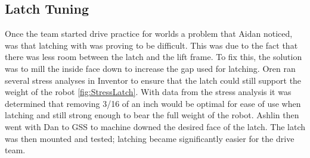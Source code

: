 \documentclass{article}
\begin{document}
\subsection{Latch Tuning}
Once the team started drive practice for worlds a problem that Aidan noticed, was that latching with was proving to be difficult. This was due to the fact that there was less room between the latch and the lift frame. To fix this, the solution was to mill the inside face down to increase the gap used for latching. Oren ran several stress analyses in Inventor to ensure that the latch could still support the weight of the robot \ref{fig:StressLatch}. With data from the stress analysis it was determined that removing 3/16 of an inch would be optimal for ease of use when latching and still strong enough to bear the full weight of the robot. Ashlin then went with Dan to GSS to machine downed the desired face of the latch. The latch was then mounted and tested; latching became significantly easier for the drive team.  
\end{document}

